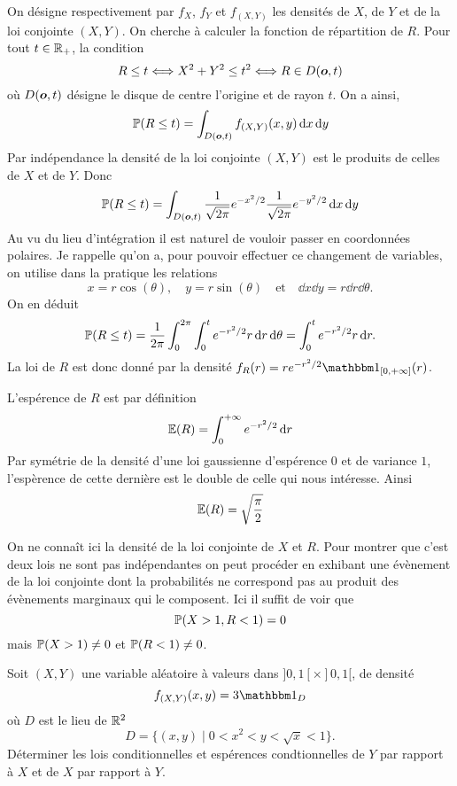 \documentclass[11pt, a4paper]{article}
\begin{document}
\begin{solution}
  On désigne respectivement par $f_X$, $f_Y$ et $f_{(X, Y)}$ les
  densités de $X$, de $Y$ et de la loi conjointe $(X, Y)$. On cherche
  à calculer la fonction de répartition de $R$. Pour tout
  $t \in \mathbb{R}_+$, la condition
  \[
  R \leq t \Longleftrightarrow X^2 + Y^2 \leq t^2 \Longleftrightarrow
  R \in D(\boldsymbol{o}, t)
  \]
  où $D(\boldsymbol{o}, t)$ désigne le disque de centre l'origine et de rayon
  $t$. On a ainsi,
  \[
  \mathbb{P}(R \leq t) = \int_{D(\boldsymbol{o}, t)} f_{(X, Y)}(x, y)\operatorname{d\!}{x}\operatorname{d\!}{y}
  \]
  Par indépendance la densité de la loi conjointe $(X, Y)$ est le
  produits de celles de $X$ et de $Y$. Donc
  \[
  \mathbb{P}(R \leq t) = \int_{D(\boldsymbol{o}, t)}
  \frac{1}{\sqrt{2\pi}}e^{-x^2/2}\frac{1}{\sqrt{2\pi}}e^{-y^2/2}\operatorname{d\!}{x}\operatorname{d\!}{y}
  \]
  Au vu du lieu d'intégration il est naturel de vouloir passer en
  coordonnées polaires. Je rappelle qu'on a, pour pouvoir effectuer ce
  changement de variables, on utilise dans la pratique les relations
  \[
  x = r\cos(\theta), \quad y = r\sin(\theta) \quad \textrm{et} \quad
  \dd{x}\dd{y} = r\dd{r}\dd{\theta}.
  \]
  On en déduit
  \[
  \mathbb{P}(R \leq t) = \frac{1}{2\pi}\int_0^{2\pi}\int_0^t
  e^{-r^2/2}r\operatorname{d\!}{r}\operatorname{d\!}{\theta} = \int_0^te^{-r^2/2}r\operatorname{d\!}{r}.
  \]
  La loi de $R$ est donc donné par la densité
  $f_R(r) = re^{-r^2/2}\bOne_{[0, +\infty]}(r)$.

  \noindent L'espérence de $R$ est par définition
  \[
  \mathbb{E}(R) = \int_0^{+\infty} e^{-r^2/2}\operatorname{d\!}{r}
  \]
  Par symétrie de la densité d'une loi gaussienne d'espérence $0$ et
  de variance $1$, l'espèrence de cette dernière est le double de
  celle qui nous intéresse. Ainsi
  \[
  \mathbb{E}(R) = \sqrt{\frac{\pi}{2}}
  \]

  \noindent On ne connaît ici la densité de la loi conjointe de $X$ et
  $R$. Pour montrer que c'est deux lois ne sont pas indépendantes on
  peut procéder en exhibant une évènement de la loi conjointe dont la
  probabilités ne correspond pas au produit des évènements marginaux
  qui le composent. Ici il suffit de voir que
  \[
  \mathbb{P}(X > 1, R < 1) = 0
  \]
  mais $\mathbb{P}(X > 1) \neq 0$ et $\mathbb{P}(R < 1) \neq 0$.
\end{solution}


\begin{question}
  Soit $(X, Y)$ une variable aléatoire à valeurs dans
  $]0, 1[\times ]0, 1[$, de densité
  \[
  f_{(X, Y)}(x, y) = 3\bOne_D
  \]
  où $D$ est le lieu de $\mathbb{R}^2$
  \[
  D = \big\{(x, y) \mid 0 < x^2 < y < \sqrt{x} < 1\big\}.
  \]
  Déterminer les lois conditionnelles et espérences condtionnelles de
  $Y$ par rapport à $X$ et de $X$ par rapport à $Y$.
\end{question}
\end{document}
